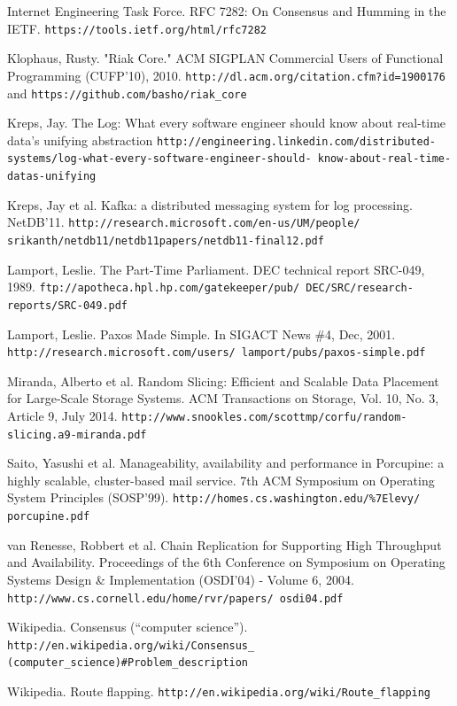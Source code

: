 \documentclass[preprint,10pt]{sigplanconf}
\begin{document}
\begin{thebibliography}{}
Internet Engineering Task Force.
RFC 7282: On Consensus and Humming in the IETF.
{\tt https://tools.ietf.org/html/rfc7282}

Klophaus, Rusty.
"Riak Core."
ACM SIGPLAN Commercial Users of Functional Programming (CUFP'10), 2010.
{\tt http://dl.acm.org/citation.cfm?id=1900176} and
{\tt https://github.com/basho/riak\_core}

Kreps, Jay.
The Log: What every software engineer should know about real-time data's unifying abstraction
{\tt http://engineering.linkedin.com/distributed-
  systems/log-what-every-software-engineer-should-
  know-about-real-time-datas-unifying}

Kreps, Jay et al.
Kafka: a distributed messaging system for log processing.
NetDB’11.
{\tt http://research.microsoft.com/en-us/UM/people/
  srikanth/netdb11/netdb11papers/netdb11-final12.pdf}

Lamport, Leslie.
The Part-Time Parliament.
DEC technical report SRC-049, 1989.
{\tt ftp://apotheca.hpl.hp.com/gatekeeper/pub/ DEC/SRC/research-reports/SRC-049.pdf}

Lamport, Leslie.
Paxos Made Simple.
In SIGACT News \#4, Dec, 2001.
{\tt http://research.microsoft.com/users/ lamport/pubs/paxos-simple.pdf}

Miranda, Alberto et al.
Random Slicing: Efficient and Scalable Data Placement for Large-Scale Storage Systems.
ACM Transactions on Storage, Vol. 10, No. 3, Article 9, July 2014.
{\tt http://www.snookles.com/scottmp/corfu/random- slicing.a9-miranda.pdf}

Saito, Yasushi et al.
Manageability, availability and performance in Porcupine: a highly scalable, cluster-based mail service.
7th ACM Symposium on Operating System Principles (SOSP’99).
{\tt http://homes.cs.washington.edu/\%7Elevy/ porcupine.pdf}

van Renesse, Robbert et al.
Chain Replication for Supporting High Throughput and Availability.
Proceedings of the 6th Conference on Symposium on Operating Systems
Design \& Implementation (OSDI'04) - Volume 6, 2004.
{\tt http://www.cs.cornell.edu/home/rvr/papers/ osdi04.pdf}

Wikipedia.
Consensus (``computer science'').
{\tt http://en.wikipedia.org/wiki/Consensus\_ (computer\_science)\#Problem\_description}

Wikipedia.
Route flapping.
{\tt http://en.wikipedia.org/wiki/Route\_flapping}

\end{thebibliography}
\end{document}
